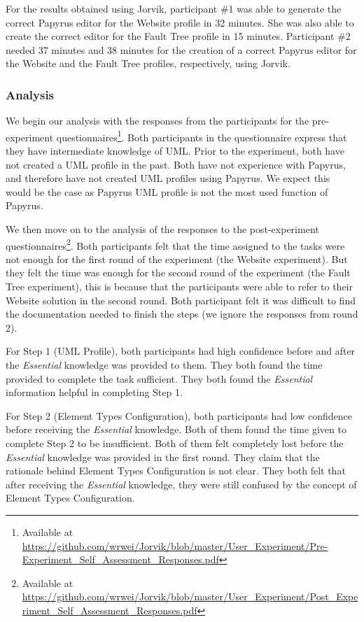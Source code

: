 For the results obtained using Jorvik, participant \#1 was able to generate the correct Papyrus editor for the Website profile in 32 minutes. She was also able to create the correct editor for the Fault Tree profile in 15 minutes.
Participant \#2 needed 37 minutes and 38 minutes for the creation of a correct Papyrus editor for the Website and the Fault Tree profiles, respectively, using Jorvik.


\subsubsection{Analysis} 
We begin our analysis with the responses from the participants for the pre-experiment questionnaires\footnote{Available at \url{https://github.com/wrwei/Jorvik/blob/master/User_Experiment/Pre-Experiment_Self_Assessment_Responses.pdf}}.
Both participants in the questionnaire express that they have intermediate knowledge of UML. 
Prior to the experiment, both have not created a UML profile in the past.
Both have not experience with Papyrus, and therefore have not created UML profiles using Papyrus.
We expect this would be the case as Papyrus UML profile is not the most used function of Papyrus.

We then move on to the analysis of the responses to the post-experiment questionnaires\footnote{Available at \url{https://github.com/wrwei/Jorvik/blob/master/User_Experiment/Post_Experiment_Self_Assessment_Responses.pdf}}. 
Both participants felt that the time assigned to the tasks were not enough for the first round of the experiment (the Website experiment).
But they felt the time was enough for the second round of the experiment (the Fault Tree experiment), this is because that the participants were able to refer to their Website solution in the second round.
Both participant felt it was difficult to find the documentation needed to finish the steps (we ignore the responses from round 2).

For Step 1 (UML Profile), both participants had high confidence before and after the \textit{Essential} knowledge was provided to them. 
They both found the time provided to complete the task sufficient.
They both found the \textit{Essential} information helpful in completing Step 1.

For Step 2 (Element Types Configuration), both participants had low confidence before receiving the \textit{Essential} knowledge.
Both of them found the time given to complete Step 2 to be insufficient.
Both of them felt completely lost before the \textit{Essential} knowledge was provided in the first round.
They claim that the rationale behind Element Types Configuration is not clear.
They both felt that after receiving the \textit{Essential} knowledge, they were still confused by the concept of Element Types Configuration.

